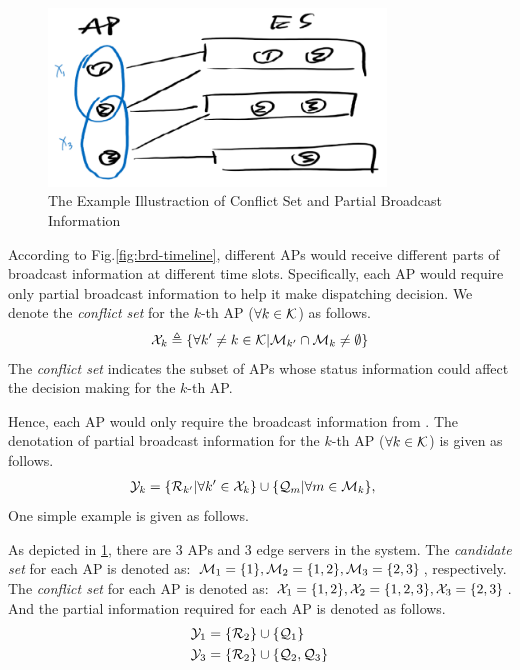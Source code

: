 \begin{figure}[ht]
    \centering
    \includegraphics[width=0.80\textwidth]{images/draft-conflict.png}
    \caption{The Example Illustraction of Conflict Set and Partial Broadcast Information}
    \label{fig:conflict}
\end{figure}

According to Fig.\ref{fig:brd-timeline}, different APs would receive different parts of broadcast information at different time slots.
Specifically, each AP would require only partial broadcast information to help it make dispatching decision.
We denote the \emph{conflict set} for the $k$-th AP ($\forall k\in\mathcal{K}$) as follows.
\begin{align}
    \mathcal{X}_k \triangleq \{\forall k' \neq k\in\mathcal{K}|\mathcal{M}_{k'} \cap \mathcal{M}_{k} \neq \emptyset\}
\end{align}
The \emph{conflict set} indicates the subset of APs whose status information could affect the decision making for the $k$-th AP.

Hence, each AP would only require the broadcast information from .
The denotation of partial broadcast information for the $k$-th AP ($\forall k\in\mathcal{K}$) is given as follows.
\begin{align}
    \mathcal{Y}_{k} &= \{\mathcal{R}_{k'} | \forall k'\in\mathcal{X}_{k}\}
                    \cup \{\mathcal{Q}_{m} | \forall m\in\mathcal{M}_{k}\},
\end{align}
One simple example is given as follows.
\begin{example}
    As depicted in \ref{fig:conflict}, there are 3 APs and 3 edge servers in the system.
    The \emph{candidate set} for each AP is denoted as: $\mathcal{M}_{1}=\{1\}, \mathcal{M}_{2}=\{1,2\}, \mathcal{M}_{3}=\{2,3\}$, respectively.
    The \emph{conflict set} for each AP is denoted as: $\mathcal{X}_{1}=\{1,2\}, \mathcal{X}_{2}=\{1,2,3\}, \mathcal{X}_{3}=\{2,3\}$.
    And the partial information required for each AP is denoted as follows.
    \begin{align*}
        \mathcal{Y}_{1} &= \{ \mathcal{R}_{2} \} \cup \{ \mathcal{Q}_{1} \}
        \\
        \mathcal{Y}_{3} &= \{ \mathcal{R}_{2} \} \cup \{ \mathcal{Q}_{2}, \mathcal{Q}_{3} \}
    \end{align*}
\end{example}

